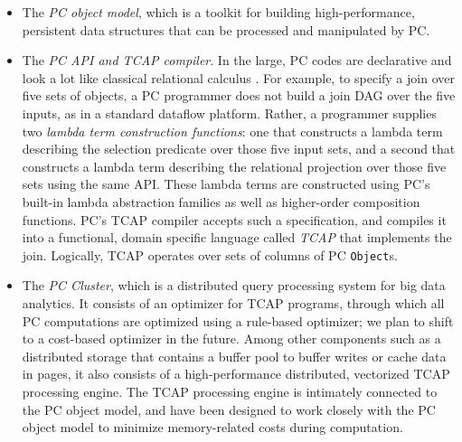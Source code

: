 \begin{itemize}
\item The \emph{PC object model}, which is a toolkit for building high-performance, persistent data structures that can be 
processed and manipulated by PC.  

\item The \emph{PC API and TCAP compiler}.  In the large, PC codes are declarative and look a lot like classical relational calculus \cite{codd1971data}.  For example, to specify a join over five sets of objects, a PC programmer does not build a join DAG over the five inputs, as in a standard
dataflow platform.  Rather, a programmer 
supplies two \emph{lambda term construction functions}: one that constructs a lambda term describing the selection
predicate over those five input sets, 
and a second that constructs a lambda term describing the relational projection over those five sets
using the same API.  These lambda terms are constructed using PC's built-in lambda abstraction families as well as higher-order composition functions.
 PC's TCAP compiler 
accepts such a specification, and compiles it into a functional, domain specific language called \emph{TCAP} that implements
the join.  Logically, TCAP operates over
sets of columns of PC \texttt{Object}s. 

\item The \emph{PC Cluster}, which is a distributed query processing
  system for big data analytics. It consists of an optimizer for TCAP
  programs, through which all PC computations are optimized using a rule-based
optimizer; we plan to shift to a cost-based optimizer in the
future. Among other components such as a distributed storage that
contains a buffer pool to buffer writes or cache data in pages, it also consists of a
high-performance distributed, vectorized TCAP processing engine. 
The TCAP processing engine is intimately connected to the PC object model, 
and have been designed to work closely with the PC object model to minimize memory-related costs during computation.


\end{itemize}

